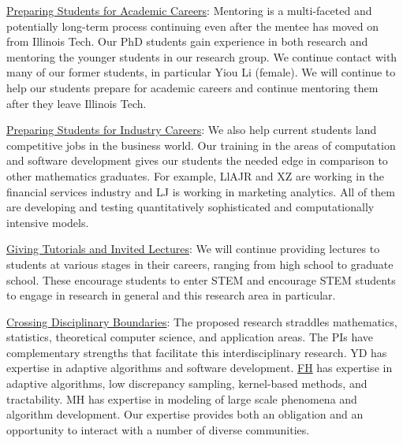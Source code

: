\documentclass[11pt]{NSFamsart}
\newcommand{\Upara}[1]{\noindent\underline{\upshape #1}:}
\newcommand{\FH}{\hyperlink{FHlink}{FH}\xspace}
\begin{document}
\Upara{Preparing Students for Academic Careers} 
Mentoring is a multi-faceted and 
potentially long-term process continuing even after the mentee has moved on from Illinois Tech. 
Our PhD students gain experience in both research and mentoring the younger students in our research group. We 
continue contact with many of our former students, in particular Yiou Li (female). We will continue to help our students prepare for academic careers and continue mentoring them after they leave Illinois Tech.

\Upara{Preparing Students for Industry Careers}
We also help current students land 
competitive jobs in the business world. Our training in the areas of computation and software 
development gives our students the needed edge in comparison to other mathematics 
graduates. For example, LlAJR and XZ are working in the financial services industry and LJ is 
working in marketing analytics. All of them are developing and testing quantitatively sophisticated and computationally intensive models. 

\Upara{Giving Tutorials and Invited Lectures}
We will continue providing lectures to students at various stages in their careers, ranging from high school to graduate school. These encourage students to enter STEM and encourage STEM students 
to engage in research in general and this research area in particular.



\Upara{Crossing Disciplinary Boundaries} The proposed research straddles mathematics, statistics, theoretical computer science, and 
application areas. The PIs have complementary strengths that facilitate this interdisciplinary research. YD has expertise in adaptive algorithms and software development. \FH has expertise in adaptive algorithms, low discrepancy sampling, kernel-based methods, and tractability. MH has expertise in modeling of large scale phenomena and algorithm development. Our expertise provides both an obligation and an opportunity to interact with a number of diverse communities.
\end{document}
